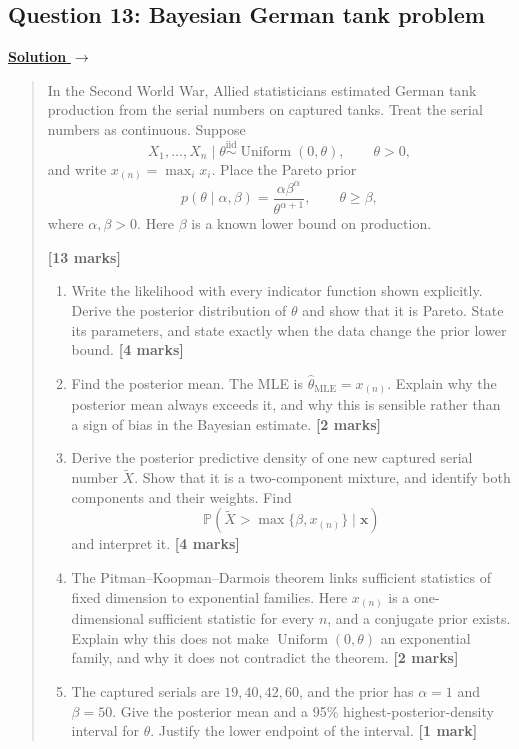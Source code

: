 \documentclass[11pt,a4paper]{article}
\newcommand{\xvec}{\boldsymbol{x}}
\newenvironment{examquestion}[2]
  {\subsection{#1}\label{question:\arabic{subsection}}\label{#2}%
   \noindent\hyperref[answer:\arabic{subsection}]{\textbf{Solution} $\rightarrow$}%
   \begin{quote}\color{statgrey}}
  {\end{quote}}
\begin{document}
\begin{examquestion}{Question 13: Bayesian German tank problem}{question:practice-bayesian-german-tank-problem}
In the Second World War, Allied statisticians estimated German tank
production from the serial numbers on captured tanks. Treat the serial
numbers as continuous. Suppose
\[
X_1,\ldots,X_n\mid\theta
\overset{\mathrm{iid}}{\sim}\operatorname{Uniform}(0,\theta),
\qquad \theta>0,
\]
and write $x_{(n)}=\max_i x_i$. Place the Pareto prior
\[
p(\theta\mid\alpha,\beta)
=\frac{\alpha\beta^\alpha}{\theta^{\alpha+1}},
\qquad \theta\geq\beta,
\]
where $\alpha,\beta>0$. Here $\beta$ is a known lower bound on production.

\textbf{[13 marks]}

\begin{enumerate}[label=(\alph*)]
  \item Write the likelihood with every indicator function shown explicitly.
        Derive the posterior distribution of $\theta$ and show that it is
        Pareto. State its parameters, and state exactly when the data change
        the prior lower bound. \textbf{[4 marks]}

  \item Find the posterior mean. The MLE is
        $\widehat{\theta}_{\mathrm{MLE}}=x_{(n)}$. Explain why the posterior
        mean always exceeds it, and why this is sensible rather than a sign
        of bias in the Bayesian estimate. \textbf{[2 marks]}

  \item Derive the posterior predictive density of one new captured serial
        number $\widetilde X$. Show that it is a two-component mixture, and
        identify both components and their weights. Find
        \[
        \mathbb{P}\!\left(
          \widetilde X>\max\{\beta,x_{(n)}\}\mid\xvec
        \right)
        \]
        and interpret it. \textbf{[4 marks]}

  \item The Pitman--Koopman--Darmois theorem links sufficient statistics of
        fixed dimension to exponential families. Here $x_{(n)}$ is a
        one-dimensional sufficient statistic for every $n$, and a conjugate
        prior exists. Explain why this does not make
        $\operatorname{Uniform}(0,\theta)$ an exponential family, and why it
        does not contradict the theorem. \textbf{[2 marks]}

  \item The captured serials are $19,40,42,60$, and the prior has
        $\alpha=1$ and $\beta=50$. Give the posterior mean and a 95\%
        highest-posterior-density interval for $\theta$. Justify the lower
        endpoint of the interval. \textbf{[1 mark]}
\end{enumerate}
\end{examquestion}
\end{document}
